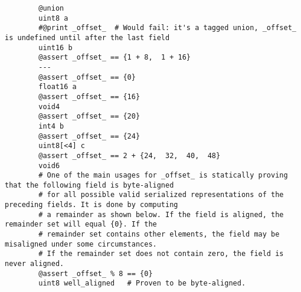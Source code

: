 \begin{remark}
    \begin{verbatim}
        @union
        uint8 a
        #@print _offset_  # Would fail: it's a tagged union, _offset_ is undefined until after the last field
        uint16 b
        @assert _offset_ == {1 + 8,  1 + 16}
        ---
        @assert _offset_ == {0}
        float16 a
        @assert _offset_ == {16}
        void4
        @assert _offset_ == {20}
        int4 b
        @assert _offset_ == {24}
        uint8[<4] c
        @assert _offset_ == 2 + {24,  32,  40,  48}
        void6
        # One of the main usages for _offset_ is statically proving that the following field is byte-aligned
        # for all possible valid serialized representations of the preceding fields. It is done by computing
        # a remainder as shown below. If the field is aligned, the remainder set will equal {0}. If the
        # remainder set contains other elements, the field may be misaligned under some circumstances.
        # If the remainder set does not contain zero, the field is never aligned.
        @assert _offset_ % 8 == {0}
        uint8 well_aligned   # Proven to be byte-aligned.
    \end{verbatim}
\end{remark}

